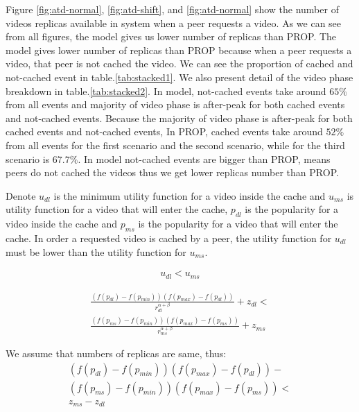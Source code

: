 \documentclass[10pt,final,journal,a4paper]{IEEEtran}
\begin{document}
Figure \ref{fig:atd-normal}, \ref{fig:atd-shift}, and \ref{fig:atd-normal} show the number of  videos replicas available in system when a peer requests a video.
As we can see from all figures, the model gives us lower number of replicas than PROP.
The model gives lower number of replicas than PROP because when a peer requests a video, that peer is not cached the video.
We can see the proportion of cached and not-cached event in table.\ref{tab:stacked1}. 
We also present detail of the video phase breakdown in table.\ref{tab:stacked2}.
In model, not-cached events take around $65\%$ from all events and majority of video phase is  after-peak for both cached events and not-cached events. 
Because the majority of video phase is  after-peak for both cached events and not-cached events, 
In PROP, cached events take around $52\%$ from all events for the first scenario and the second scenario, while for the third scenario is $67.7\%$.
In model not-cached events are bigger than PROP, means peers do not cached the videos thus we get lower replicas number than PROP.


Denote $u_{dl}$ is the minimum utility function for a video inside the cache and $u_{ms}$ is utility function for a video that will enter the cache,  $p_{dl}$ is the popularity for a video inside the cache and $p_{ms}$ is the popularity for a video that will enter the cache.
In order a requested video is cached by a peer, the utility function for $u_{dl}$ must be lower than the utility function for $u_{ms}$.

\begin{align}\label{eq:dlms_1}
u_{dl} < u_{ms}
\end{align}

\begin{multline}\label{eq:dlms_2}
\frac{ (f(p_{dl}) - f(p_{min})) (f(p_{max}) - f(p_{dl})) }{r^{\alpha + \beta}_{dl}} + z_{dl} < \\
\frac{ (f(p_{ms}) - f(p_{min})) (f(p_{max}) - f(p_{ms})) }{r^{\alpha + \beta}_{ms}} + z_{ms}
\end{multline}

We assume that numbers of replicas are same, thus:
\begin{multline}\label{eq:dlms_3}
(f(p_{dl}) - f(p_{min})) (f(p_{max}) - f(p_{dl})) - \\ 
(f(p_{ms}) - f(p_{min})) (f(p_{max}) - f(p_{ms})) < \\
z_{ms} - z_{dl}
\end{multline}
\end{document}
